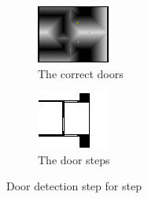 \begin{figure}[ht]
\begin{subfigure}[t]{0.3\textwidth}
    \includegraphics[width = \textwidth]{graphics/correct_doors}
    \caption{The correct doors}
    \label{correct_doors}
  \end{subfigure}
  \begin{subfigure}[t]{0.3\textwidth}
    \includegraphics[width = \textwidth]{graphics/door_steps}
    \caption{The door steps}
    \label{door_steps}
  \end{subfigure}
\caption{Door detection step for step}
\label{door_detections_steps}
\end{figure}